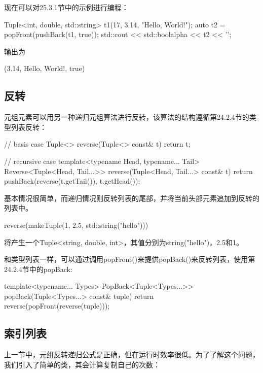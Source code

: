 现在可以对25.3.1节中的示例进行编程：

\begin{cpp}
Tuple<int, double, std::string> t1(17, 3.14, "Hello, World!");
auto t2 = popFront(pushBack(t1, true));
std::cout << std::boolalpha << t2 << '\n';
\end{cpp}

输出为

\begin{shell}
(3.14, Hello, World!, true)
\end{shell}

\subsection{反转}

元组元素可以用另一种递归元组算法进行反转，该算法的结构遵循第24.2.4节的类型列表反转：

\begin{cpp}
// basis case
Tuple<> reverse(Tuple<> const& t) {
	return t;
}

// recursive case
template<typename Head, typename... Tail>
Reverse<Tuple<Head, Tail...>> reverse(Tuple<Head, Tail...> const& t) {
	return pushBack(reverse(t.getTail()), t.getHead());
}
\end{cpp}

基本情况很简单，而递归情况则反转列表的尾部，并将当前头部元素追加到反转的列表中。

\begin{cpp}
reverse(makeTuple(1, 2.5, std::string("hello")))
\end{cpp}

将产生一个Tuple<string, double, int>，其值分别为string("hello")，2.5和1。

和类型列表一样，可以通过调用popFront()来提供popBack()来反转列表，使用第24.2.4节中的popBack:

\begin{cpp}
template<typename... Types>
PopBack<Tuple<Types...>>
popBack(Tuple<Types...> const& tuple) {
	return reverse(popFront(reverse(tuple)));
}
\end{cpp}

\subsection{索引列表}

上一节中，元组反转递归公式是正确，但在运行时效率很低。为了了解这个问题，我们引入了简单的类，其会计算复制自己的次数：

